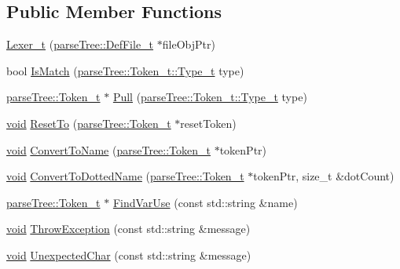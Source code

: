 \subsection*{Public Member Functions}
\begin{DoxyCompactItemize}
\item 
\hyperlink{class_lexer__t_a3b619fa6fdaa02aca63a22dfedad9cb1}{Lexer\+\_\+t} (\hyperlink{structparse_tree_1_1_def_file__t}{parse\+Tree\+::\+Def\+File\+\_\+t} $\ast$file\+Obj\+Ptr)
\item 
bool \hyperlink{class_lexer__t_af5667bc29e8f4bfafc60cda984abfbbe}{Is\+Match} (\hyperlink{structparse_tree_1_1_token__t_ac0e6319a9ad80509dd4aa1037ba66096}{parse\+Tree\+::\+Token\+\_\+t\+::\+Type\+\_\+t} type)
\item 
\hyperlink{structparse_tree_1_1_token__t}{parse\+Tree\+::\+Token\+\_\+t} $\ast$ \hyperlink{class_lexer__t_aea34f12422a31914c13d6bc652a9c3a9}{Pull} (\hyperlink{structparse_tree_1_1_token__t_ac0e6319a9ad80509dd4aa1037ba66096}{parse\+Tree\+::\+Token\+\_\+t\+::\+Type\+\_\+t} type)
\item 
\hyperlink{_t_e_m_p_l_a_t_e__cdef_8h_ac9c84fa68bbad002983e35ce3663c686}{void} \hyperlink{class_lexer__t_a46cd2e9a399c5a86313d8309bf0478d2}{Reset\+To} (\hyperlink{structparse_tree_1_1_token__t}{parse\+Tree\+::\+Token\+\_\+t} $\ast$reset\+Token)
\item 
\hyperlink{_t_e_m_p_l_a_t_e__cdef_8h_ac9c84fa68bbad002983e35ce3663c686}{void} \hyperlink{class_lexer__t_afdc8e2f5af74f9585d2a9e223d478962}{Convert\+To\+Name} (\hyperlink{structparse_tree_1_1_token__t}{parse\+Tree\+::\+Token\+\_\+t} $\ast$token\+Ptr)
\item 
\hyperlink{_t_e_m_p_l_a_t_e__cdef_8h_ac9c84fa68bbad002983e35ce3663c686}{void} \hyperlink{class_lexer__t_a9841a27715698b13db4c822d9ed606ba}{Convert\+To\+Dotted\+Name} (\hyperlink{structparse_tree_1_1_token__t}{parse\+Tree\+::\+Token\+\_\+t} $\ast$token\+Ptr, size\+\_\+t \&dot\+Count)
\item 
\hyperlink{structparse_tree_1_1_token__t}{parse\+Tree\+::\+Token\+\_\+t} $\ast$ \hyperlink{class_lexer__t_aa8457a8f759f1ca84c615d9d50c0ee9a}{Find\+Var\+Use} (const std\+::string \&name)
\item 
\hyperlink{_t_e_m_p_l_a_t_e__cdef_8h_ac9c84fa68bbad002983e35ce3663c686}{void} \hyperlink{class_lexer__t_a732f558af4b7232ee1cafec8d87840d2}{Throw\+Exception} (const std\+::string \&message)
\item 
\hyperlink{_t_e_m_p_l_a_t_e__cdef_8h_ac9c84fa68bbad002983e35ce3663c686}{void} \hyperlink{class_lexer__t_aa4bb9cab015df705b6c0fc52fe0e78e5}{Unexpected\+Char} (const std\+::string \&message)
\end{DoxyCompactItemize}
